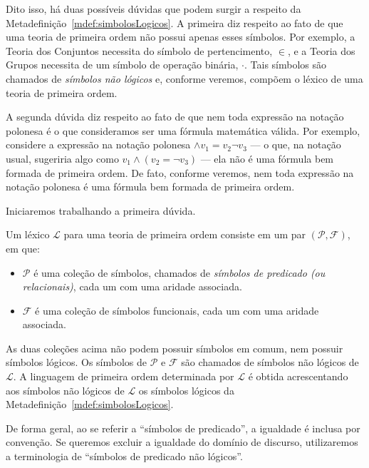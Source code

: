 Dito isso, há duas possíveis dúvidas que podem surgir a respeito da Metadefinição~\ref{mdef:simbolosLogicos}.
A primeira diz respeito ao fato de que uma teoria de primeira ordem não possui apenas esses símbolos.
Por exemplo, a Teoria dos Conjuntos necessita do símbolo de pertencimento, $\in$, e a Teoria dos Grupos necessita de um símbolo de operação binária, $\cdot$.
Tais símbolos são chamados de \emph{símbolos não lógicos} e, conforme veremos, compõem o léxico de uma teoria de primeira ordem.

A segunda dúvida diz respeito ao fato de que nem toda expressão na notação polonesa é o que consideramos ser uma fórmula matemática válida.
Por exemplo, considere a expressão na notação polonesa ${\wedge} v_1 {=} v_2 \neg v_3$ --- o que, na notação usual, sugeriria algo como $v_1 \wedge (v_2 = \neg v_3)$ --- ela não é uma fórmula bem formada de primeira ordem.
De fato, conforme veremos, nem toda expressão na notação polonesa é uma fórmula bem formada de primeira ordem.

Iniciaremos trabalhando a primeira dúvida.

\begin{metadefinition}\label{mdef:lexicoPrimeiraOrdem}
    Um léxico $\mathcal L$ para uma teoria de primeira ordem consiste em um par $(\mathcal P, \mathcal F)$, em que:

    \begin{itemize}
        \item $\mathcal P$ é uma coleção de símbolos, chamados de \emph{símbolos de predicado (ou relacionais)}, cada um com uma aridade associada.
        \item $\mathcal F$ é uma coleção de símbolos funcionais, cada um com uma aridade associada.
    \end{itemize}
    As duas coleções acima não podem possuir símbolos em comum, nem possuir símbolos lógicos.
    Os símbolos de $\mathcal P$ e $\mathcal F$ são chamados de símbolos não lógicos de $\mathcal L$.
    A linguagem de primeira ordem determinada por $\mathcal L$ é obtida acrescentando aos símbolos não lógicos de $\mathcal L$ os símbolos lógicos da Metadefinição~\ref{mdef:simbolosLogicos}.
\end{metadefinition}

De forma geral, ao se referir a ``símbolos de predicado'', a igualdade é inclusa por convenção.
Se queremos excluir a igualdade do domínio de discurso, utilizaremos a terminologia de ``símbolos de predicado não lógicos''.

